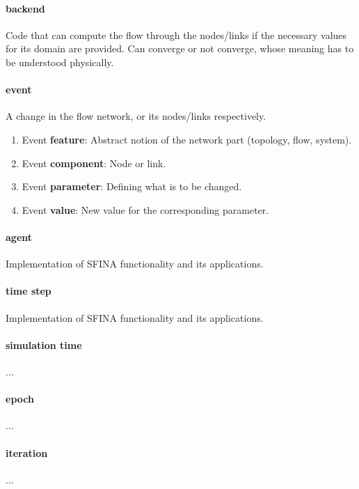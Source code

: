 \documentclass[11pt,fleqn]{book} %
\begin{document}
\paragraph{backend}
Code that can compute the flow through the nodes/links if the necessary values for its domain are provided. Can converge or not converge, whose meaning has to be understood physically.

\paragraph{event}
A change in the flow network, or its nodes/links respectively.
\begin{enumerate}
	\item Event \textbf{feature}: Abstract notion of the network part (topology, flow, system).
	\item Event \textbf{component}: Node or link.
	\item Event \textbf{parameter}: Defining what is to be changed.
	\item Event \textbf{value}: New value for the corresponding parameter.
\end{enumerate}

\paragraph{agent}
Implementation of SFINA functionality and its applications.

\paragraph{time step}
Implementation of SFINA functionality and its applications.

\paragraph{simulation time}
...

\paragraph{epoch}
...

\paragraph{iteration}
...
\end{document}
